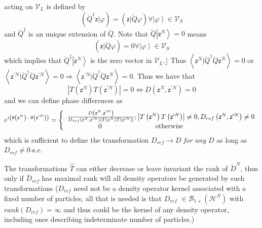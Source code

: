 \documentclass[aps,preprint]{revtex4}%
\begin{document}
acting on $\mathcal{V}_{L}$ is defined by
\begin{equation}
\left(  \breve{Q}^{\ddagger}\mathsf{z}|\varphi\right)  =\left(  \mathsf{z}%
|\breve{Q}\varphi\right)  \forall\left\vert \varphi\right\rangle
\in\mathcal{V}_{S}%
\end{equation}
and $\breve{Q}^{\ddagger}$ is an unique extension of $\breve{Q}$. Note that
$\breve{Q}\left\vert \mathsf{z}^{N}\right\rangle =0$ means
\begin{equation}
\left(  \mathsf{z}|\breve{Q}\varphi\right)  =0\forall\left\vert \varphi
\right\rangle \in\mathcal{V}_{S}%
\end{equation}
which implies that $\breve{Q}^{\ddagger}\left\vert \mathsf{z}^{N}\right\rangle
$ is the zero vector in $\mathcal{V}_{L}$.$\rfloor$ Thus $\left\langle
\mathsf{z}^{N}|\breve{Q}^{\dagger}\breve{Q}\mathsf{z}^{N}\right\rangle =0$ or
$\left\langle \mathsf{z}^{\prime N}|\breve{Q}^{\dagger}\breve{Q}%
\mathsf{z}^{\prime N}\right\rangle =0\Rightarrow\left\langle \mathsf{z}%
^{\prime N}|\breve{Q}^{\dagger}\breve{Q}\mathsf{z}^{N}\right\rangle =0$. Thus
we have that
\begin{equation}
\left\vert T\left(  \mathsf{z}^{N}\right)  T\left(  \mathsf{z}^{\prime
N}\right)  \right\vert =0\Longleftrightarrow D\left(  \mathsf{z}%
^{N},\mathsf{z}^{\prime N}\right)  =0
\end{equation}
and we can define phase differences as
\begin{equation}
e^{i\left(  \theta\left(  \mathsf{z}^{N}\right)  -\theta\left(  \mathsf{z}%
^{\prime N}\right)  \right)  }=\left\{
\begin{array}
[c]{c}%
\frac{D\left(  \mathsf{z}^{N},\mathsf{z}^{\prime N}\right)  }{D_{ref}\left(
\mathsf{z}^{N},\mathsf{z}^{\prime N}\right)  \left\vert T\left(
\mathsf{z}^{N}\right)  T\left(  \mathsf{z}^{\prime N}\right)  \right\vert
};\left\vert T\left(  \mathsf{z}^{N}\right)  T\left(  \mathsf{z}^{\prime
N}\right)  \right\vert \neq0,D_{ref}\left(  \mathsf{z}^{N},\mathsf{z}^{\prime
N}\right)  \neq0\\
\text{\qquad\qquad}0\qquad\text{\qquad\qquad\qquad otherwise\qquad\qquad
\qquad\qquad\qquad}%
\end{array}
\right.
\end{equation}
which is sufficient to define the transformation $D_{ref}\rightarrow D$
\emph{for any }$D$ as long as $D_{ref}\neq0\,a.e.$

The transformations $\hat{T}$ can either decrease or leave invariant the rank
of $\breve{D}^{N}$, thus only if $\breve{D}_{ref}$ has maximal rank will all
density operators be generated by such transformations ($D_{ref}$ need not be
a density operator kernel associated with a fixed number of particles, all
that is needed is that $D_{ref}$ $\in\mathcal{B}_{1+}\left(  \mathcal{H}%
^{N}\right)  $ with $rank\left(  D_{ref}\right)  =\infty$ and thus could be
the kernel of any density operator, including ones describing indeterminate
number of particles.)
\end{document}

